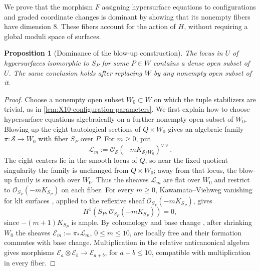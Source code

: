 \documentclass[11pt]{article}
\theoremstyle{plain}
\newtheorem{proposition}[proposition]{Proposition}
\theoremstyle{definition}
\theoremstyle{remark}
\newcommand{\OO}{\mathcal O}
\begin{document}
We prove that the morphism \(F\) assigning hypersurface equations to
configurations and graded coordinate changes is dominant by showing that
its nonempty fibers have dimension \(8\). These fibers account for the
action of \(H\), without requiring a global moduli space of surfaces.

\begin{proposition}[Dominance of the blow-up construction]
\label{prop:X10-blowup-dominance}
The locus in \(U\) of hypersurfaces isomorphic to \(S_P\) for some
\(P\in W\) contains a dense open subset of \(U\).
The same conclusion holds after replacing \(W\) by any nonempty open
subset of it.
\end{proposition}

\begin{proof}
Choose a nonempty open subset \(W_0\subset W\) on which the tuple
stabilizers are trivial, as in
\cref{lem:X10-configuration-parameters}. We first explain how to choose
hypersurface equations algebraically on a further nonempty open subset
of \(W_0\). Blowing up the eight tautological sections of
\(Q\times W_0\) gives an algebraic family
\(\pi:\mathscr S\to W_0\) with fiber \(S_P\) over \(P\). For \(m\geq0\),
put
\[
\mathcal L_m:=\OO_{\mathscr S}(-mK_{\mathscr S/W_0})^{\vee\vee}.
\]
The eight centers lie in the smooth locus of \(Q\), so near the fixed
quotient singularity the family is unchanged from \(Q\times W_0\); away
from that locus, the blow-up family is smooth over \(W_0\). Thus the
sheaves \(\mathcal L_m\) are flat over \(W_0\) and restrict to
\(\OO_{S_P}(-mK_{S_P})\) on each fiber.
For every \(m\geq0\), Kawamata--Viehweg vanishing for klt surfaces
\cite[Theorem~2.70]{Kollar1998}, applied to the reflexive sheaf
\(\OO_{S_P}(-mK_{S_P})\), gives
\[
H^1(S_P,\OO_{S_P}(-mK_{S_P}))=0,
\]
since \(-(m+1)K_{S_P}\) is ample. By cohomology and base change
\cite[Chapter~III, Theorem~12.11]{Hartshorne1977}, after shrinking \(W_0\)
the sheaves
\(\mathcal E_m:=\pi_*\mathcal L_m\), \(0\leq m\leq10\), are locally free
and their formation commutes with base change. Multiplication in the relative
anticanonical algebra gives morphisms
\(\mathcal E_a\otimes\mathcal E_b\to\mathcal E_{a+b}\), for
\(a+b\leq10\), compatible with multiplication in every fiber.


\end{proof}
\end{document}
